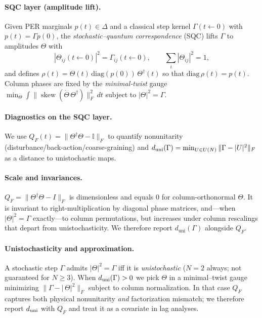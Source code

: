 \documentclass[11pt]{article}
\begin{document}
\paragraph{SQC layer (amplitude lift).}
Given PER marginals $p(t)\!\in\!\Delta$ and a classical step kernel $\Gamma(t\!\leftarrow\!0)$ with $p(t)=\Gamma p(0)$, the \emph{stochastic–quantum correspondence} (SQC) lifts $\Gamma$ to amplitudes $\Theta$ with
\[
|\Theta_{ij}(t\!\leftarrow\!0)|^2=\Gamma_{ij}(t\!\leftarrow\!0),\qquad
\sum_i|\Theta_{ij}|^2=1,
\]
and defines $\rho(t)=\Theta(t)\,\mathrm{diag}(p(0))\,\Theta^\dagger(t)$ so that $\mathrm{diag}\,\rho(t)=p(t)$.
Column phases are fixed by the \emph{minimal‑twist} gauge
$\min_\Theta\!\int\|\operatorname{skew}(\dot\Theta\,\Theta^\dagger)\|_F^2\,dt$ subject to $|\Theta|^2=\Gamma$.

\paragraph{Diagnostics on the SQC layer.}
We use $Q_F(t)=\|\Theta^\dagger\Theta-\mathbb{I}\|_F$ to quantify nonunitarity (disturbance/back‑action/coarse‑graining) and
$d_{\rm uni}(\Gamma)=\min_{U\in U(N)}\|\Gamma-|U|^2\|_F$ as a distance to unistochastic maps.

\paragraph{Scale and invariances.}
$Q_F=\|\Theta^\dagger\Theta-I\|_F$ is dimensionless and equals $0$ for column-orthonormal $\Theta$.
It is invariant to right-multiplication by diagonal phase matrices, and—when $|\Theta|^2=\Gamma$ exactly—to column permutations,
but increases under column rescalings that depart from unistochasticity. We therefore report $d_{\mathrm{uni}}(\Gamma)$ alongside $Q_F$.

\paragraph{Unistochasticity and approximation.}
A stochastic step $\Gamma$ admits $|\Theta|^2=\Gamma$ iff it is \emph{unistochastic} ($N=2$ always; not guaranteed for $N\ge3$).
When $d_{\rm uni}(\Gamma)>0$ we pick $\Theta$ in a minimal–twist gauge minimizing $\|\Gamma-|\,\Theta|^2\|_F$ subject to column normalization.
In that case $Q_F$ captures both physical nonunitarity \emph{and} factorization mismatch; we therefore report $d_{\rm uni}$ with $Q_F$ and treat it as a covariate in lag analyses.
\end{document}
